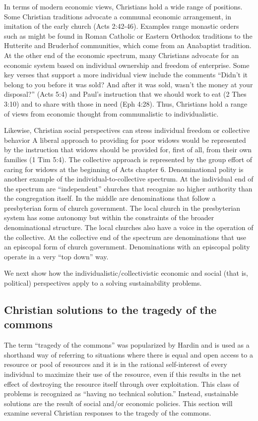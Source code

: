 \documentclass[12pt]{article}
\begin{document}
In terms of modern economic views, Christians hold a wide range of positions. Some Christian traditions advocate a
communal economic arrangement, in imitation of the early church (Acts 2:42-46). Examples range monastic orders such as
might be found in Roman Catholic or Eastern Orthodox traditions to the Hutterite and Bruderhof communities, which come
from an Anabaptist tradition. At the other end of the economic spectrum, many Christians advocate for an economic system
based on individual ownership and freedom of enterprise. Some key verses that support a more individual view include the
comments ``Didn’t it belong to you before it was sold? And after it was sold, wasn’t the money at your disposal?'' (Acts
5:4) and Paul's instruction that we should work to eat (2 Thes 3:10) and to share with those in need (Eph 4:28).
Thus, Christians hold a range of views from economic thought from communalistic to individualistic.

Likewise, Christian social perspectives can stress individual freedom or collective behavior
A liberal approach to providing for poor widows would be represented by the instruction that widows should be 
provided for, first of all, from their own families (1 Tim 5:4). 
The collective approach is represented by the group effort of caring for widows at the beginning of Acts chapter 6.
Denominational polity is another example of the individual-to-collective spectrum.
At the individual end of the spectrum are ``independent'' churches that recognize no higher authority than the congregation itself.
In the middle are denominations that follow a presbyterian form of church 
government. The local church in the presbyterian system has some autonomy but within the constraints of the broader 
denominational structure. The local churches also have a voice in the operation of the collective. At the collective end of the spectrum 
are denominations that use an episcopal form of church government. Denominations with an episcopal polity operate in a very ``top down'' 
way.

We next show how the individualistic/collectivistic economic and social (that is, political) perspectives apply to a solving sustainability problems.

\subsection{Christian solutions to the tragedy of the commons}
\label{sec:totc}
The term ``tragedy of the commons'' was popularized by Hardin \autocite{Hardin68} 
and is used as a shorthand way of referring to
situations where there is equal and open access to a resource or pool of resources and it is in the rational self-interest of
every individual to maximize their use of the resource, even if this results in the net effect of destroying the
resource itself through over exploitation. This class of problems is recognized as ``having no technical solution.''
Instead, sustainable solutions are the result of social and/or economic policies. This section will examine several
Christian responses to the tragedy of the commons.
\end{document}
